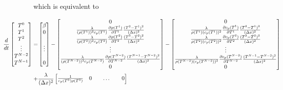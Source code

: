 \documentclass{scrartcl}[12pt, halfparskip]
\begin{document}
which is equivalent to

\begin{align*}
	\hspace{-6cm}
	\frac{d}{dt} \begin{bmatrix*}
	T^0 \\
	T^1 \\
	T^2 \\
	\vdots \\
	T^{N-2} \\
	T^{N-1}
	\end{bmatrix*} = & 
	\begin{bmatrix}
		\beta \\
		0 \\
		\\
		\vdots \\
		\\
		0
	\end{bmatrix}
	-
	\begin{bmatrix}
			0 \\
			\frac{\lambda}{(\rho(T^1))^2 c_p(T^1)} \frac{\partial \rho (T^1)}{\partial T^1} \frac{(T^2 - T^1)^2}{(\Delta x)^2} \\
			\frac{\lambda}{(\rho(T^2))^2 c_p(T^2)} \frac{\partial \rho (T^2)}{\partial T^2} \frac{(T^3 - T^2)^2}{(\Delta x)^2} \\
			\vdots \\
			\frac{\lambda}{(\rho(T^{N-2}))^2 c_p(T^{N-2})} \frac{\partial \rho (T^{N-2})}{\partial T^{N-2}} \frac{(T^{N-1} - T^{N-2})^2}{(\Delta x)^2} \\	
			0 \\			
	\end{bmatrix}
	- 
	\begin{bmatrix}
		0 \\
		\frac{\lambda}{\rho(T^1) (c_p(T^1))^2} \frac{\partial c_p (T^1)}{\partial T^1} \frac{(T^2 - T^1)^2}{(\Delta x)^2} \\
		\frac{\lambda}{\rho(T^2) (c_p(T^2))^2} \frac{\partial c_p (T^2)}{\partial T^2} \frac{(T^3 - T^2)^2}{(\Delta x)^2} \\
		\vdots \\
		\frac{\lambda}{\rho(T^{N-2}) (c_p(T^{N-2}))^2} \frac{\partial c_p (T^{N-2})}{\partial T^{N-2}} \frac{(T^{N-1} - T^{N-2})^2}{(\Delta x)^2} \\	
		0 \\			
	\end{bmatrix} \\
	+ & \frac{\lambda}{(\Delta x)^2}
	\begin{bmatrix}
		\frac{1}{c_p(T^0) \rho(T^0)} & 0 & & \dots & & 0 \\

\end{bmatrix}
\end{align*}
\end{document}
